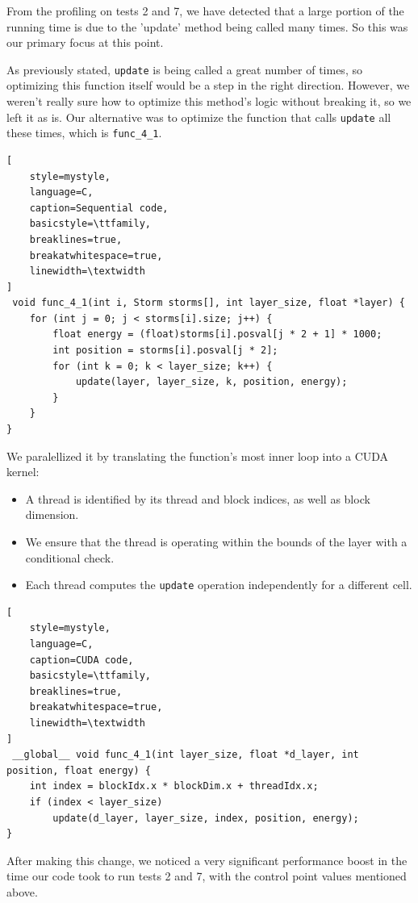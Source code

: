 \documentclass[10pt,journal,compsoc]{IEEEtran}
\begin{document}
\par From the profiling on tests 2 and 7, we have detected that a large portion of the running time is due to the 'update' method being called many times. So this was our primary focus at this point.

As previously stated, \texttt{update} is being called a great number of times, so optimizing this function itself would be a step in the right direction. However, we weren't really sure how to optimize this method's logic without breaking it, so we left it as is.
Our alternative was to optimize the function that calls \texttt{update} all these times, which is \texttt{func\-\_4\-\_1}.

\begin{lstlisting}[
    style=mystyle,
    language=C,
    caption=Sequential code,
    basicstyle=\ttfamily,
    breaklines=true,
    breakatwhitespace=true,
    linewidth=\textwidth
]
 void func_4_1(int i, Storm storms[], int layer_size, float *layer) {
    for (int j = 0; j < storms[i].size; j++) {
        float energy = (float)storms[i].posval[j * 2 + 1] * 1000;
        int position = storms[i].posval[j * 2];
        for (int k = 0; k < layer_size; k++) {
            update(layer, layer_size, k, position, energy);
        }
    }
}
\end{lstlisting}
We paralellized it by translating the function's most inner loop into a CUDA kernel: 
\begin{itemize}
  \item A thread is identified by its thread and block indices, as well as block dimension.
  \item We ensure that the thread is operating within the bounds of the layer with a conditional check.
  \item Each thread computes the \texttt{update} operation independently for a different cell.
\end{itemize}


\begin{lstlisting}[
    style=mystyle,
    language=C,
    caption=CUDA code,
    basicstyle=\ttfamily,
    breaklines=true,
    breakatwhitespace=true,
    linewidth=\textwidth
]
 __global__ void func_4_1(int layer_size, float *d_layer, int position, float energy) {
    int index = blockIdx.x * blockDim.x + threadIdx.x;
    if (index < layer_size)
        update(d_layer, layer_size, index, position, energy);
}

\end{lstlisting}

After making this change, we noticed a very significant performance boost in the time our code took to run tests 2 and 7,
with the control point values mentioned above.
\end{document}
